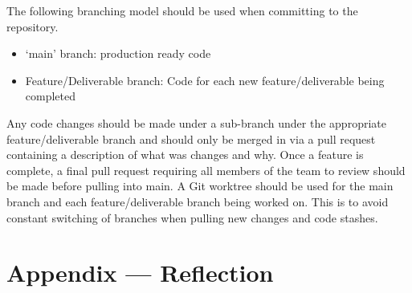 \documentclass{article}
\begin{document}
The following branching model should be used when committing to the repository.
\begin{itemize}
  \item `main' branch: production ready code
  \item Feature/Deliverable branch: Code for each new feature/deliverable being completed
\end{itemize}

Any code changes should be made under a sub-branch under the appropriate feature/deliverable branch and should only be merged in via a pull request containing a description of what was changes and why. Once a feature is complete, a final pull request requiring all members of the team to review should be made before pulling into main.
\newline\newline
A Git worktree should be used for the main branch and each feature/deliverable branch being worked on. This is to avoid constant switching of branches when pulling new changes and code stashes.

\newpage{}

\section*{Appendix --- Reflection}
\end{document}
